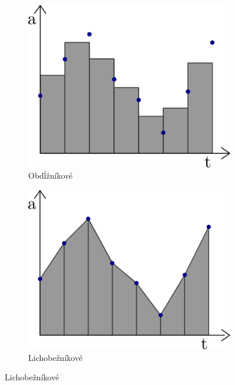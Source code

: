 \begin{figure}[h]
\centering
\begin{subfigure}[b]{0.32\textwidth}
    \centering
    \includegraphics[width=\textwidth]{figures/analysis/rectangular-rule.png}
    \caption{Obdĺžníkové}
    \label{fig:midpoint-rule}
\end{subfigure}
\hfill
\begin{subfigure}[b]{0.32\textwidth}
    \centering
    \includegraphics[width=\textwidth]{figures/analysis/trapezoidal-rule.png}
    \caption{Lichobežníkové}
    \label{fig:trapezodial-rule}
\end{subfigure}

\end{figure}
